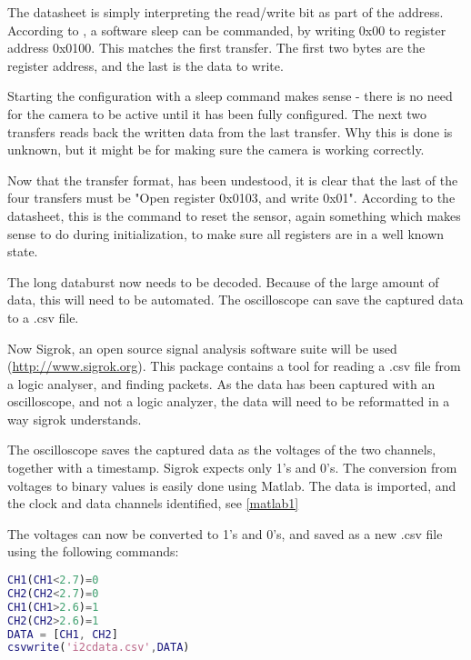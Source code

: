 The datasheet is simply interpreting the read/write bit as part of the address.\\

According to \citep[p. 23]{picam_datasheet}, a software sleep can be commanded, by writing 0x00 to register address 0x0100. This matches the first transfer. The first two bytes are the register address, and the last is the data to write.

Starting the configuration with a sleep command makes sense - there is no need for the camera to be active until it has been fully configured. The next two transfers reads back the written data from the last transfer. Why this is done is unknown, but it might be for making sure the camera is working correctly.

Now that the transfer format, has been undestood, it is clear that the last of the four transfers must be "Open register 0x0103, and write 0x01". According to the datasheet, this is the command to reset the sensor, again something which makes sense to do during initialization, to make sure all registers are in a well known state.

The long databurst now needs to be decoded. Because of the large amount of data, this will need to be automated. The oscilloscope can save the captured data to a \gls{.csv} file.

Now Sigrok, an open source signal analysis software suite will be used (\url{http://www.sigrok.org}). This package contains a tool for reading a .csv file from a logic analyser, and finding \iic packets. As the data has been captured with an oscilloscope, and not a logic analyzer, the data will need to be reformatted in a way sigrok understands.

The oscilloscope saves the captured data as the voltages of the two channels, together with a timestamp. Sigrok expects only 1's and 0's. The conversion from voltages to binary values is easily done using Matlab. The data is imported, and the clock and data channels identified, see \autoref{matlab1}

\clearpage
The voltages can now be converted to 1's and 0's, and saved as a new .csv file using the following commands:
\begin{lstlisting}[caption={Matlab commands}, language=Matlab, label=matlab2]
CH1(CH1<2.7)=0
CH2(CH2<2.7)=0
CH1(CH1>2.6)=1
CH2(CH2>2.6)=1
DATA = [CH1, CH2]
csvwrite('i2cdata.csv',DATA)
\end{lstlisting}

